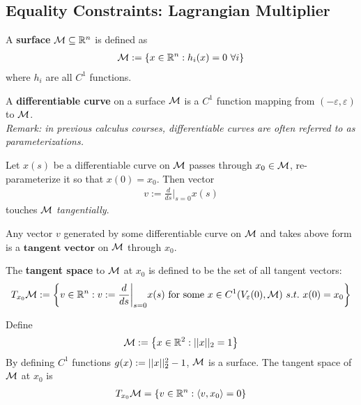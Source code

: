 \documentclass{article}
\begin{document}
   	\subsection{Equality Constraints: Lagrangian Multiplier}
   	\begin{definition}
   		A \textbf{surface} $\mathcal{{M}} \subseteq \mathbb{R}^n$ is defined as
   		\begin{align}
   			\mathcal{{M}} := \left \{
   			x \in \mathbb{R}^n : h_i (x) = 0\ \forall i
   			\right \}
   		\end{align}
   		where $h_i$ are all $C^1$ functions.
   	\end{definition}
   	
   	\begin{definition}
   		A \textbf{differentiable curve} on a surface $\mathcal{{M}}$ is a $C^1$ function mapping from $(-\varepsilon, \varepsilon)$ to $\mathcal{{M}}$. \\
   		\emph{Remark: in previous calculus courses, differentiable curves are often referred to as parameterizations.}
   	\end{definition}
   	Let $x(s)$ be a differentiable curve on $\mathcal{{M}}$ passes through $x_0 \in \mathcal{{M}}$, re-parameterize it so that $x(0) = x_0$. Then vector
   	\begin{align}
   		v := \frac{d}{ds} \bigg \vert_{s=0} x(s)
   	\end{align}
   	touches $\mathcal{{M}}$ \emph{tangentially}.
   	
   	\begin{definition}
   		Any vector $v$ generated by some differentiable curve on $\mathcal{{M}}$ and takes above form is a $\textbf{tangent vector}$ on $\mathcal{{M}}$ through $x_0$.
   	\end{definition}
   	
   	\begin{definition}
   		The \textbf{tangent space} to $\mathcal{{M}}$ at $x_0$ is defined to be the set of all tangent vectors:
   		\begin{align}
   			T_{x_0} \mathcal{{M}} := \left \{
   			v \in \mathbb{R}^n
   			:
   			v := \frac{d}{ds} \bigg \vert_{s=0} x(s) \text{{ for some }} x \in C^1(V_\varepsilon(0), \mathcal{{M}})\ s.t.\ x(0) = x_0
   			\right \}
   		\end{align}
   	\end{definition}
   	
   	\begin{example}
   		Define 
   		\begin{align}
   			\mathcal{{M}} := \left\{x \in \mathbb{R}^2: \vert \vert {x} \vert \vert_2 = 1 \right\}
   		\end{align}
   		By defining $C^1$ functions $g(x) := \vert \vert {x} \vert \vert^2_2  - 1$, $\mathcal{{M}}$ is a surface. The tangent space of $\mathcal{{M}}$ at $x_0$ is
   		\begin{align}
   			T_{x_0} \mathcal{{M}} = \left \{
   			v \in \mathbb{R}^n:
   			\langle {v}, {x_0} \rangle = 0
   			\right \}
   		\end{align}
   	\end{example}
   	
\end{document}

